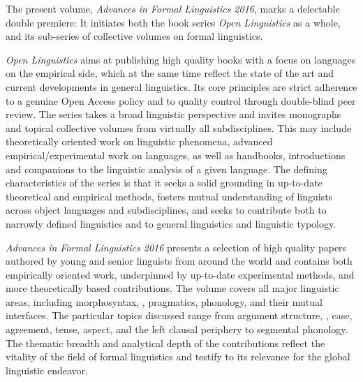 \begin{refsection}

The present volume, \textit{Advances in Formal  Linguistics 2016}, marks a delectable double premiere: It initiates both the book series \textit{Open  Linguistics} as a whole, and its sub-series of collective volumes on formal  linguistics. 

\textit{Open  Linguistics} aims at publishing high quality books with a focus on  languages on the empirical side, which at the same time reflect the state of the art and current developments in general linguistics. Its core principles are strict adherence to a genuine Open Access policy and to quality control through double-blind peer review. The series takes a broad linguistic perspective and invites monographs and topical collective volumes from virtually all subdisciplines. This may include theoretically oriented work on  linguistic phenomena, advanced empirical\slash experimental work on  languages, as well as handbooks, introductions and companions to the linguistic analysis of a given language. The defining characteristics of the series is that it seeks a solid grounding in up-to-date theoretical and empirical methods, fosters mutual understanding of linguists across object languages and subdisciplines, and seeks to contribute both to narrowly defined  linguistics and to general linguistics and linguistic typology. 

\textit{Advances in Formal  Linguistics 2016} presents a selection of high quality papers authored by young and senior linguists from around the world and contains both empirically oriented work, underpinned by up-to-date experimental methods, and more theoretically based contributions. The volume covers all major linguistic areas, including morphosyntax, , pragmatics, phonology, and their mutual interfaces. The particular topics discussed range from argument structure, , case, agreement, tense, aspect, and the left clausal periphery to segmental phonology. The thematic breadth and analytical depth of the contributions reflect the vitality of the field of formal  linguistics and testify to its relevance for the global linguistic endeavor. 


\end{refsection}

